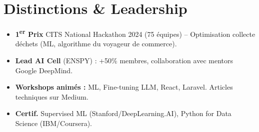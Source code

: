\documentclass[a4paper,11pt]{article}
\begin{document}
\section{Distinctions \& Leadership}
\begin{itemize}[leftmargin=*, label=\tiny$\bullet$, nosep]
    \item \small{\textbf{1\textsuperscript{er} Prix} CITS National Hackathon 2024 (75 équipes) -- Optimisation collecte déchets (ML, algorithme du voyageur de commerce).}
    \item \small{\textbf{Lead AI Cell} (ENSPY) : +50\% membres, collaboration avec mentors Google DeepMind.}
    \item \small{\textbf{Workshops animés :} ML, Fine-tuning LLM, React, Laravel. Articles techniques sur Medium.}
    \item \small{\textbf{Certif.} Supervised ML (Stanford/DeepLearning.AI), Python for Data Science (IBM/Coursera).}
\end{itemize}
\end{document}
